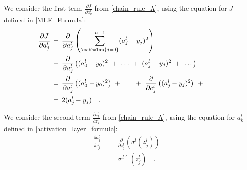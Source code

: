             We consider the first term $\frac{ { \partial J } } { {  \partial a^{l}_{k} } }$ from \ref{chain_rule_A}, using the equation for $J$ defined in \ref{MLE_Formula}:
            \begin{align}
                \frac{ { \partial J } } { { \partial a^{l}_{j} } } \,
                    & = \, 
                        \frac{ { \partial } } { { \partial a^{l}_{j} } } \left( \sum_{\mathclap{j=0}}^{n-1} (a^{l}_{j} - y_{j})^2 \right) 
                    \nonumber \\
                    & = \, 
                        \frac{ { \partial } } { { \partial a^{l}_{j} } } 
                            \left( 
                                (a^{l}_{0} - y_{0})^2 \, \, + \, \,
                                \dots \, \, + \, \,
                                (a^{l}_{j} - y_{j})^2 \, \, + \, \,
                                \dots 
                            \right) 
                        \nonumber \\
                    & = \, 
                        \frac{ { \partial } } { { \partial a^{l}_{j} } }  \left( (a^{l}_{0} - y_{0})^2 \right)  \, \, + \, \,
                        \dots \, \, + \, \,
                        \frac{ { \partial } } { { \partial a^{l}_{j} } } \left( (a^{l}_{j} - y_{j})^2 \right) \, \, + \, \,
                        \dots 
                        \nonumber \\
                    & = \, 
                        2(a^{l}_{j} - y_{j}) \quad .
                        \nonumber \\
            \end{align}
            
            We consider the second term $\frac{ { \partial a^{l}_{k} } } { { \partial z^{l}_{k} } }$ from \ref{chain_rule_A}, using the equation for $a^{l}_{k}$ defined in \ref{activation_layer_formula}:
            \begin{align}
                \frac{ { \partial a^{l}_{j} } } { { \partial z^{l}_{j} } } \,
                    & = \, 
                        \frac{ { \partial } } { { \partial z^{l}_{j} } } \left( \sigma^{l}{ (z^{l}_{j}) } \right) 
                    \nonumber \\
                    & = \, 
                        {\sigma^{\,l}}\,^{'}{\,\, (z^{l}_{j}) } \quad .
                        \nonumber \\
            \end{align}
            
